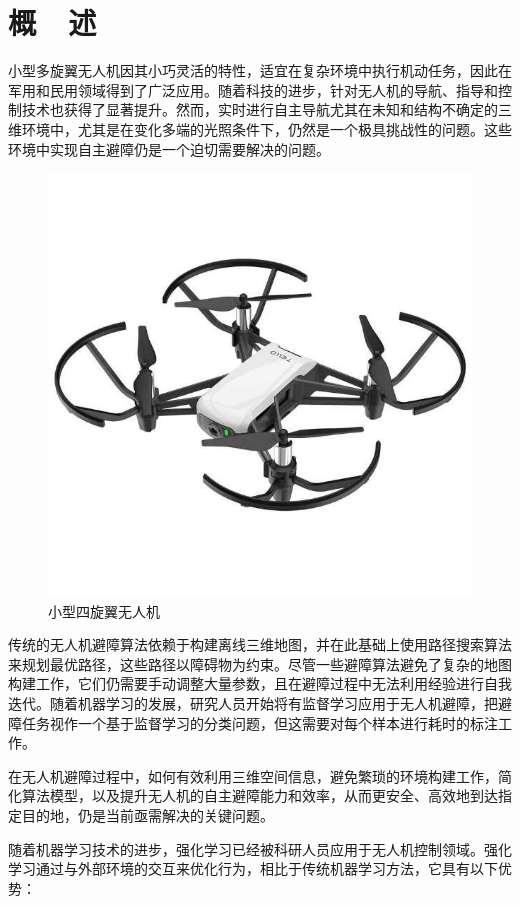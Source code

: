 \documentclass{thuemp}
\begin{document}
\section{概~~述}
\enlargethispage{-3.3cm}

小型多旋翼无人机因其小巧灵活的特性，适宜在复杂环境中执行机动任务，因此在军用和民用领域得到了广泛应用。随着科技的进步，针对无人机的导航、指导和控制技术也获得了显著提升。然而，实时进行自主导航尤其在未知和结构不确定的三维环境中，尤其是在变化多端的光照条件下，仍然是一个极具挑战性的问题。这些环境中实现自主避障仍是一个迫切需要解决的问题。

\begin{figure}[H]
  \centering
  \includegraphics[width=0.8\linewidth]{./img/UAV.jpg}
  \caption{小型四旋翼无人机}
\end{figure}
传统的无人机避障算法依赖于构建离线三维地图，并在此基础上使用路径搜索算法来规划最优路径，这些路径以障碍物为约束。尽管一些避障算法避免了复杂的地图构建工作，它们仍需要手动调整大量参数，且在避障过程中无法利用经验进行自我迭代。随着机器学习的发展，研究人员开始将有监督学习应用于无人机避障，把避障任务视作一个基于监督学习的分类问题，但这需要对每个样本进行耗时的标注工作。

在无人机避障过程中，如何有效利用三维空间信息，避免繁琐的环境构建工作，简化算法模型，以及提升无人机的自主避障能力和效率，从而更安全、高效地到达指定目的地，仍是当前亟需解决的关键问题。

随着机器学习技术的进步，强化学习已经被科研人员应用于无人机控制领域。强化学习通过与外部环境的交互来优化行为，相比于传统机器学习方法，它具有以下优势：
  
\end{document}
